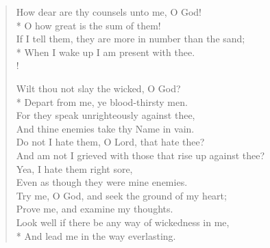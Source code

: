 \documentclass[MAIN]{subfiles}
\begin{document}
\begin{verse}
How dear are thy counsels unto me, O God!\\*
\vin O how great is the sum of them!\\
If I tell them, they are more in number than the sand;\\*
\vin When I wake up I am present with thee.\\!

Wilt thou not slay the wicked, O God?\\*
\vin Depart from me, ye blood-thirsty men.\\
For they speak unrighteously against thee,\\
\vin And thine enemies take thy Name in vain.\\
Do not I hate them, O Lord, that hate thee?\\
\vin And am not I grieved with those that rise up against thee?\\
Yea, I hate them right sore,\\
\vin Even as though they were mine enemies.\\
Try me, O God, and seek the ground of my heart;\\
\vin Prove me, and examine my thoughts.\\
Look well if there be any way of wickedness in me,\\*
\vin And lead me in the way everlasting.
\end{verse}
\end{document}
